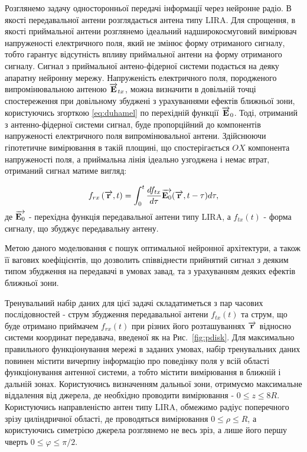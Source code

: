 Розглянемо задачу односторонньої передачі інформації через нейронне радіо. 
В якості передавальної антени розглядається антена типу LIRA. Для спрощення, 
в якості приймальної антени розглянемо ідеальний надширокосмуговий вимірювач 
напруженості електричного поля, який не змінює форму отриманого сигналу,
тобто гарантує відсутність впливу приймальної антени на форму отриманого 
сигналу. Сигнал з приймальної антено-фідерної системи подається на деяку 
апаратну нейронну мережу. Напруженість електричного поля, породженого 
випромінювальною антеною $ \overrightarrow{\mathbf E}_{tx} $, можна визначити в довільній 
точці спостереження при довільному збуджені з урахуваннями ефектів ближньої 
зони, користуючись згорткою \eqref{eq:duhamel} по перехідній функції 
$ \overrightarrow{\mathbf E}_0 $. Тоді, отриманий з антенно-фідерної системи сигнал, буде 
пропорційний до компонентів напруженості електричного поля випромінювальної 
антени. Здійснюючи гіпотетичне вимірювання в такій площині, що спостерігається 
$ OX $ компонента напруженості поля, а приймальна лінія ідеально узгоджена і 
немає втрат, отриманий сигнал матиме вигляд:

\begin{equation}
f_{rx} \left( \overrightarrow{\mathbf r}, t \right) = 
\int_0^t \frac{d f_{tx}}{d \tau} \overrightarrow{\mathbf E_0} (\overrightarrow{\mathbf r}, t - \tau) d \tau,
\end{equation}
%
де $ \overrightarrow{\mathbf E_0} $ - перехідна функція передавальної антени типу LIRA, а 
$ f_{tx} (t) $ - форма сигналу, що збуджує передавальну антену.

Метою даного моделювання є пошук оптимальної нейронної архітектури, а також 
її вагових коефіцієнтів, що дозволить співвіднести прийнятий сигнал з деяким 
типом збудження на передавачі в умовах завад, та з урахуванням деяких ефектів 
ближньої зони.

Тренувальний набір даних для цієї задачі складатиметься з пар часових 
послідовностей - струм збудження передавальної антени $ f_{tx} (t) $ та струм, 
що буде отримано приймачем $ f_{rx} (t) $ при різних його розташуваннях 
$ \overrightarrow{\mathbf r} $ відносно системи координат передавача, введеної як на 
Рис.~\ref{fig:pdisk}. Для максимально правильного функціонування мережі в 
заданих умовах, набір тренувальних даних повинен містити вичерпну інформацію про 
поведінку поля у всій області функціонування антенної системи, а тобто містити 
вимірювання в ближній і дальній зонах. Користуючись визначенням дальньої зони,
отримуємо максимальне віддалення від джерела, де необхідно проводити 
вимірювання - $ 0 \leq z \leq 8R $. Користуючись направленістю антен типу 
LIRA, обмежимо радіус поперечного зрізу циліндричної області, де проводяться 
вимірювання $ 0 \leq \rho \leq R $, а користуючись симетрією джерела розглянемо 
не весь зріз, а лише його першу чверть $ 0 \leq \varphi \leq \pi / 2 $.


